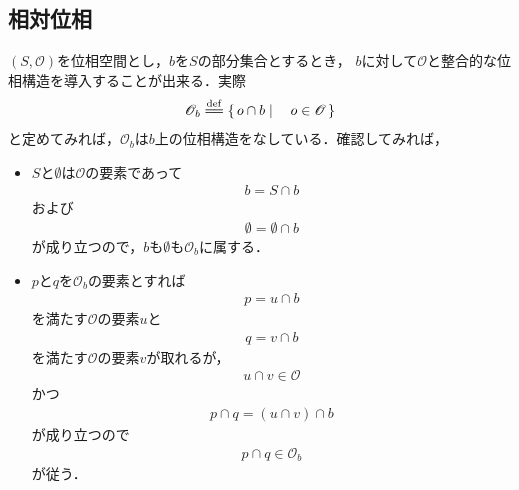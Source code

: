\subsection{相対位相}
	$(S,\mathscr{O})$を位相空間とし，$b$を$S$の部分集合とするとき，
	$b$に対して$\mathscr{O}$と整合的な位相構造を導入することが出来る．実際
	\begin{align}
		\mathscr{O}_{b} \defeq \Set{o \cap b}{o \in \mathscr{O}}
	\end{align}
	と定めてみれば，$\mathscr{O}_{b}$は$b$上の位相構造をなしている．確認してみれば，
	\begin{itemize}
		\item $S$と$\emptyset$は$\mathscr{O}$の要素であって
			\begin{align}
				b = S \cap b
			\end{align}
			および
			\begin{align}
				\emptyset = \emptyset \cap b
			\end{align}
			が成り立つので，$b$も$\emptyset$も$\mathscr{O}_{b}$に属する．
			
		\item $p$と$q$を$\mathscr{O}_{b}$の要素とすれば
			\begin{align}
				p = u \cap b
			\end{align}
			を満たす$\mathscr{O}$の要素$u$と
			\begin{align}
				q = v \cap b
			\end{align}
			を満たす$\mathscr{O}$の要素$v$が取れるが，
			\begin{align}
				u \cap v \in \mathscr{O}
			\end{align}
			かつ
			\begin{align}
				p \cap q = (u \cap v) \cap b
			\end{align}
			が成り立つので
			\begin{align}
				p \cap q \in \mathscr{O}_{b}
			\end{align}
			が従う．
			

\end{itemize}
